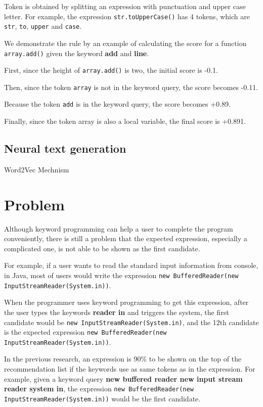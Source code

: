 \documentclass[PRO,english]{ipsj}
\begin{document}
Token is obtained by splitting an expression with punctuation and upper case letter. For example, the expression \texttt{str.toUpperCase()} has 4 tokens, which are \texttt{str}, \texttt{to}, \texttt{upper} and \texttt{case}.

We demonstrate the rule by an example of calculating the score for a function \texttt{array.add()} given the keyword \textbf{add} and \textbf{line}.

First, since the height of \texttt{array.add()} is two, the initial score is -0.1.

Then, since the token \texttt{array} is not in the keyword query, the score becomes -0.11.

Because the token \texttt{add} is in the keyword query, the score becomes +0.89.

Finally, since the token array is also a local variable, the final score is +0.891.

\subsection{Neural text generation}
Word2Vec
Mechnism

\section{Problem}
Although keyword programming can help a user to complete the program conveniently, there is still a problem that the expected expression, especially a complicated one, is not able to be shown as the first candidate.

For example, if a user wants to read the standard input information from console, in Java, most of users would write the expression \texttt{new BufferedReader(new InputStreamReader(System.in))}. 

When the programmer uses keyword programming to get this expression, after the user types the keywords \textbf{reader in} and triggers the system, the first candidate would be \texttt{new InputStreamReader(System.in)}, and the 12th candidate is the expected expression \texttt{new BufferedReader(new InputStreamReader(System.in))}. 



In the previous research, an expression is 90\% to be shown on the top of the recommendation list if the keywords use as same tokens as in the expression. For example, given a keyword query \textbf{new buffered reader new input stream reader system in}, the expression \texttt{new BufferedReader(new InputStreamReader(System.in))} would be the first candidate.
\end{document}
